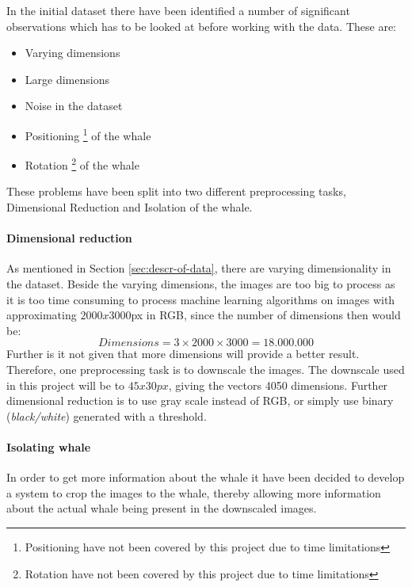 In the initial dataset there have been identified a number of significant observations which has to be looked at before working with the data.
These are:
\begin{itemize}
\item Varying dimensions
\item Large dimensions
\item Noise in the dataset
\item Positioning \footnote{Positioning have not been covered by this project due to time limitations} of the whale
\item Rotation \footnote{Rotation have not been covered by this project due to time limitations} of the whale
\end{itemize}
These problems have been split into two different preprocessing tasks, Dimensional Reduction and Isolation of the whale.

\paragraph{Dimensional reduction}

As mentioned in Section \ref{sec:descr-of-data}, there are varying dimensionality in the dataset. Beside the varying dimensions, the images are too big to process as it is too time consuming to process machine learning algorithms on images with approximating \( 2000x3000\)px in RGB, since the number of dimensions then would be:
\begin{equation}
Dimensions = 3 \times 2000 \times 3000=18.000.000
\end{equation} 
Further is it not given that more dimensions will provide a better result.
Therefore, one preprocessing task is to downscale the images.
The downscale used in this project will be to \(45x30px\), giving the vectors 4050 dimensions.
Further dimensional reduction is to use gray scale instead of RGB, or simply use binary (\emph{black/white}) generated with a threshold.

\paragraph{Isolating whale}

In order to get more information about the whale it have been decided to develop a system to crop the images to the whale, thereby allowing more information about the actual whale being present in the downscaled images.

